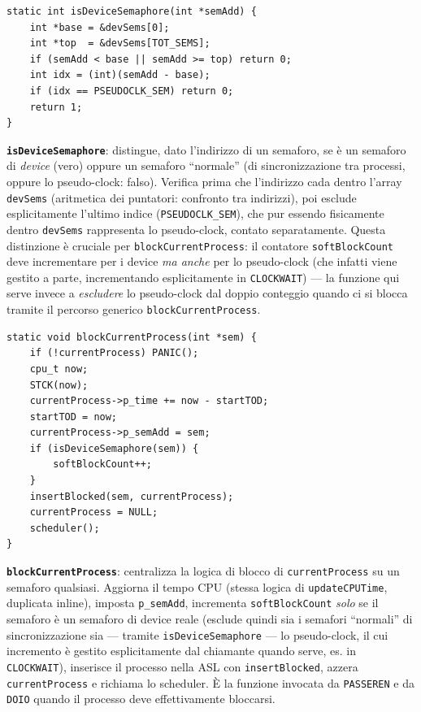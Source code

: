 \documentclass[11pt,a4paper]{article}
\newcommand{\code}[1]{\texttt{#1}}
\newcommand{\func}[1]{\textbf{\texttt{#1}}}
\begin{document}
\begin{lstlisting}
static int isDeviceSemaphore(int *semAdd) {
    int *base = &devSems[0];
    int *top  = &devSems[TOT_SEMS];
    if (semAdd < base || semAdd >= top) return 0;
    int idx = (int)(semAdd - base);
    if (idx == PSEUDOCLK_SEM) return 0;
    return 1;
}
\end{lstlisting}
\func{isDeviceSemaphore}: distingue, dato l'indirizzo di un semaforo, se è
un semaforo di \emph{device} (vero) oppure un semaforo ``normale'' (di
sincronizzazione tra processi, oppure lo pseudo-clock: falso). Verifica
prima che l'indirizzo cada dentro l'array \code{devSems} (aritmetica dei
puntatori: confronto tra indirizzi), poi esclude esplicitamente l'ultimo
indice (\code{PSEUDOCLK\_SEM}), che pur essendo fisicamente dentro
\code{devSems} rappresenta lo pseudo-clock, contato separatamente. Questa
distinzione è cruciale per \code{blockCurrentProcess}: il contatore
\code{softBlockCount} deve incrementare per i device \emph{ma anche} per lo
pseudo-clock (che infatti viene gestito a parte, incrementando
esplicitamente in \code{CLOCKWAIT}) --- la funzione qui serve invece a
\emph{escludere} lo pseudo-clock dal doppio conteggio quando ci si blocca
tramite il percorso generico \code{blockCurrentProcess}.

\begin{lstlisting}
static void blockCurrentProcess(int *sem) {
    if (!currentProcess) PANIC();
    cpu_t now;
    STCK(now);
    currentProcess->p_time += now - startTOD;
    startTOD = now;
    currentProcess->p_semAdd = sem;
    if (isDeviceSemaphore(sem)) {
        softBlockCount++;
    }
    insertBlocked(sem, currentProcess);
    currentProcess = NULL;
    scheduler();
}
\end{lstlisting}
\func{blockCurrentProcess}: centralizza la logica di blocco di
\code{currentProcess} su un semaforo qualsiasi. Aggiorna il tempo CPU
(stessa logica di \code{updateCPUTime}, duplicata inline), imposta
\code{p\_semAdd}, incrementa \code{softBlockCount} \emph{solo} se il
semaforo è un semaforo di device reale (esclude quindi sia i semafori
``normali'' di sincronizzazione sia --- tramite \code{isDeviceSemaphore}
--- lo pseudo-clock, il cui incremento è gestito esplicitamente dal
chiamante quando serve, es. in \code{CLOCKWAIT}), inserisce il processo
nella ASL con \code{insertBlocked}, azzera \code{currentProcess} e richiama
lo scheduler. \`E la funzione invocata da \code{PASSEREN} e da \code{DOIO}
quando il processo deve effettivamente bloccarsi.
\end{document}
